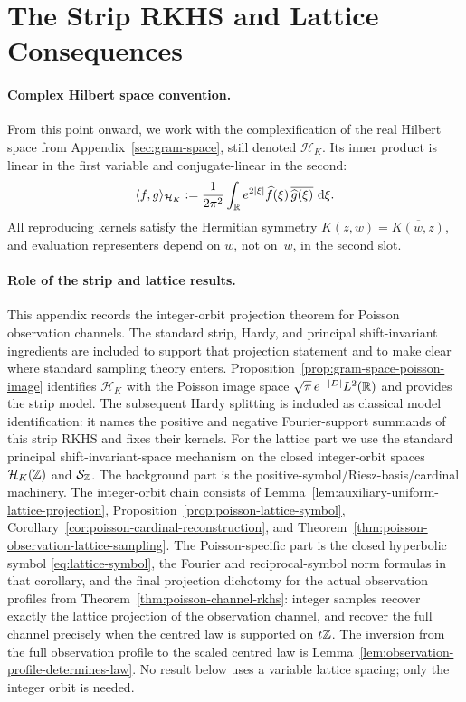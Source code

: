 \section{The Strip RKHS and Lattice Consequences}%
\label{sec:strip-lattice}

\paragraph{Complex Hilbert space convention.}
From this point onward, we work with the complexification of the real
Hilbert space from Appendix~\ref{sec:gram-space}, still denoted
$\mathcal H_K$.  Its inner product is linear in the first variable and
conjugate-linear in the second:
\[
\langle f,g\rangle_{\mathcal H_K}
:=\frac{1}{2\pi^2}\int_{\mathbb{R}}e^{2|\xi|}\widehat f(\xi)\,
\overline{\widehat g(\xi)}\,\,\mathrm{d}\xi.
\]
All reproducing kernels satisfy the Hermitian symmetry
$K(z,w)=\overline{K(w,z)}$, and evaluation representers depend on
$\overline w$, not on~$w$, in the second slot.

\paragraph{Role of the strip and lattice results.}
This appendix records the integer-orbit projection theorem for Poisson
observation channels.  The standard strip, Hardy, and principal
shift-invariant ingredients are included to support that projection statement
and to make clear where standard sampling theory enters.
Proposition~\ref{prop:gram-space-poisson-image}
identifies $\mathcal H_K$ with the Poisson image space
$\sqrt{\pi}\,e^{-|D|}L^2(\mathbb{R})$ and provides the strip model.  The subsequent
Hardy splitting is included as classical model identification: it names the
positive and negative Fourier-support summands of this strip RKHS and fixes
their kernels.  For the lattice part we use the standard principal
shift-invariant-space mechanism on the closed integer-orbit spaces
$\mathcal H_K(\mathbb{Z})$ and $\mathcal S_{\mathbb{Z}}$.
The background part is the positive-symbol/Riesz-basis/cardinal machinery.  The
integer-orbit chain consists of
Lemma~\ref{lem:auxiliary-uniform-lattice-projection},
Proposition~\ref{prop:poisson-lattice-symbol},
Corollary~\ref{cor:poisson-cardinal-reconstruction}, and
Theorem~\ref{thm:poisson-observation-lattice-sampling}.  The
Poisson-specific part is the closed hyperbolic symbol
\eqref{eq:lattice-symbol}, the Fourier and reciprocal-symbol norm formulas in
that corollary, and the final projection dichotomy for the
actual observation profiles from Theorem~\ref{thm:poisson-channel-rkhs}:
integer samples recover exactly the lattice projection of the observation
channel, and recover the full channel precisely when the centred law is
supported on \(t\mathbb{Z}\).  The inversion from the full observation profile to the
scaled centred law is Lemma~\ref{lem:observation-profile-determines-law}.
No result below uses a variable lattice spacing; only the integer orbit is
needed.

